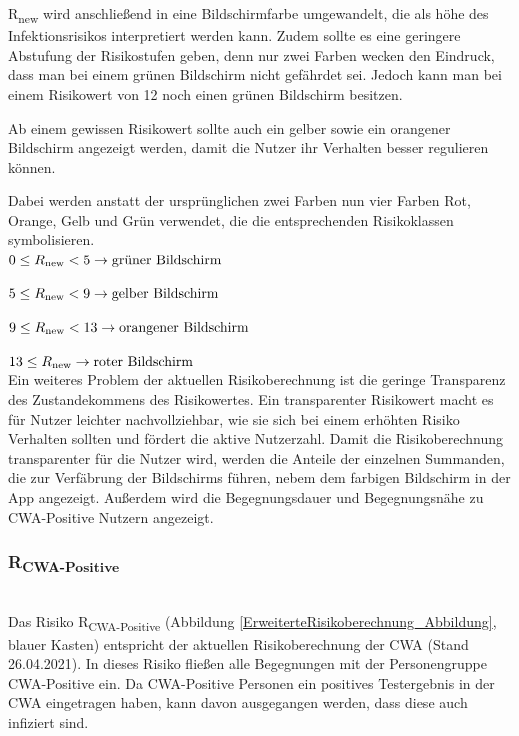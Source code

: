 \documentclass[conference,compsoc]{IEEEtran}
\begin{document}
R\textsubscript{new} wird anschließend in eine Bildschirmfarbe umgewandelt, die als höhe des Infektionsrisikos interpretiert werden kann.
Zudem sollte es eine geringere Abstufung der Risikostufen geben, denn nur zwei Farben wecken den Eindruck, dass man bei einem grünen Bildschirm nicht gefährdet sei.
Jedoch kann man bei einem Risikowert von 12 noch einen grünen Bildschirm besitzen.

Ab einem gewissen Risikowert sollte auch ein gelber sowie ein orangener Bildschirm angezeigt werden, damit die Nutzer ihr Verhalten besser regulieren können.

Dabei werden anstatt der ursprünglichen zwei Farben nun vier Farben Rot, Orange, Gelb und Grün verwendet, die die entsprechenden Risikoklassen symbolisieren.
\\

$0\le R\textsubscript{new} < 5 \rightarrow \text{grüner Bildschirm}$

$5\le R\textsubscript{new} < 9 \rightarrow \text{gelber Bildschirm}$

$9\le R\textsubscript{new} < 13 \rightarrow \text{orangener Bildschirm}$

$13 \le R\textsubscript{new}  \rightarrow \text{roter Bildschirm}$
\\

Ein weiteres Problem der aktuellen Risikoberechnung ist die geringe Transparenz des Zustandekommens des Risikowertes.
Ein transparenter Risikowert macht es für Nutzer leichter nachvollziehbar, wie sie sich bei einem erhöhten Risiko Verhalten sollten und fördert die aktive Nutzerzahl.
Damit die Risikoberechnung transparenter für die Nutzer wird, werden die Anteile der einzelnen Summanden, die zur Verfäbrung der Bildschirms führen,
nebem dem farbigen Bildschirm in der App angezeigt.
Außerdem wird die Begegnungsdauer und Begegnungsnähe zu CWA-Positive Nutzern angezeigt.\\

\subsubsection{R\textsubscript{CWA-Positive}}\label{CWAPositive}
\text{}\\
Das Risiko R\textsubscript{CWA-Positive} (Abbildung \ref{ErweiterteRisikoberechnung_Abbildung}, blauer Kasten) entspricht der aktuellen Risikoberechnung der CWA (Stand 26.04.2021). 
In dieses Risiko fließen alle Begegnungen mit der Personengruppe CWA-Positive ein. 
Da CWA-Positive Personen ein positives Testergebnis in der CWA eingetragen haben, kann davon ausgegangen werden, dass diese auch infiziert sind.
\end{document}
